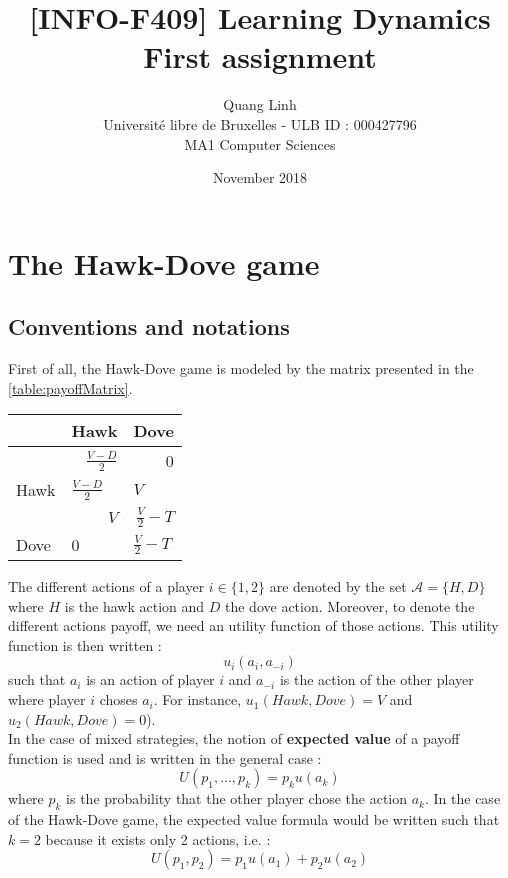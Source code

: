 \documentclass{article}
\title{[INFO-F409] Learning Dynamics \\ First assignment}
\author{\bsc{BUI QUANG PHUONG} Quang Linh \\ Université libre de Bruxelles - ULB ID : 000427796  \\ MA1 Computer Sciences}
\date{November 2018}
\begin{document}
\maketitle

\section{The Hawk-Dove game}

\subsection*{Conventions and notations}
First of all, the Hawk-Dove game is modeled by the matrix presented in the \autoref{table:payoffMatrix}. 

\begin{center}
\begin{tabular}{|l|r|r|}
  \hline
  			   & Hawk & Dove \\
  \hline
  		   & \hspace{1cm} $\frac{V-D}{2}$ & 0 \\
  	Hawk &	\multicolumn{1}{|l|}{$\frac{V-D}{2}$}		& 	\multicolumn{1}{|l|}{$V$ }		\\
  \hline
    		   & \multicolumn{1}{|r|}{$V$} & \hspace{1cm} $\frac{V}{2}-T$  \\
  Dove &	\multicolumn{1}{|l|}{0}		& 	\multicolumn{1}{|l|}{$\frac{V}{2}-T$}		\\
  \hline
\end{tabular}
\label{table:payoffMatrix}
\end{center}

The different actions of a player $i \in \{1,2\}$ are denoted by the set $\mathcal{A} = \{H,D\}$ where $H$ is the hawk action and  
$D$ the dove action. Moreover, to denote the different actions payoff, we need an utility function of those actions. This utility function is then written  : 
$$ u_{i}(a_{i}, a_{-i}) $$ such that $a_{i}$ is an action of player $i$ and $a_{-i}$ is the action of the other player where player $i$ choses $a_{i}$. For instance,  $ u_{1}(Hawk, Dove) = V $ and $ u_{2}(Hawk, Dove) = 0 $). \\

In the case of mixed strategies, the notion of \textbf{expected value} of a payoff function is used and is written in the general case :
$$ U(p_{1}, ... , p_{k }) = p_{k} u(a_{k})$$ where $p_{k}$ is the probability that the other player chose the action $a_{k}$. 
In the case of the Hawk-Dove game, the expected value formula would be written such that $k=2$ because it exists only 2 actions, i.e. :  $$ U(p_{1}, p_{2}) = p_{1} u(a_{1}) + p_{2} u(a_{2})$$
\end{document}
